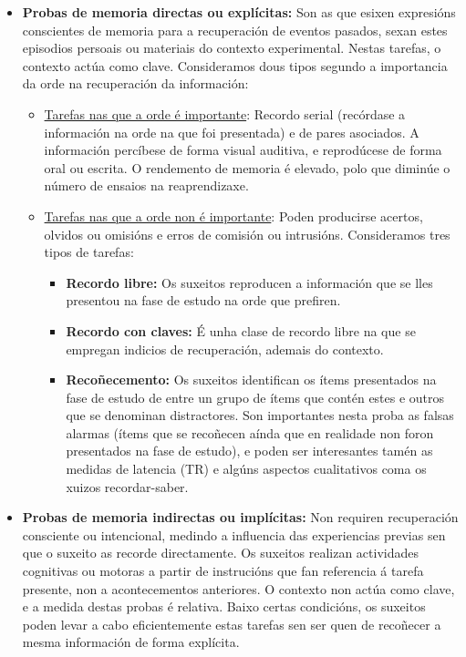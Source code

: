\documentclass[a4paper,11pt]{article}
\begin{document}
\begin{itemize}
	\item \textbf{Probas de memoria directas ou explícitas:} Son as que esixen expresións
	conscientes de memoria para a recuperación de eventos pasados, sexan estes episodios persoais ou 
	materiais do contexto experimental. Nestas tarefas, o contexto actúa como clave. Consideramos 
	dous tipos segundo a importancia da orde na recuperación da información:
	\begin{itemize}
		\item \underline{Tarefas nas que a orde é importante}: Recordo serial (recórdase a 
		información na orde na que foi presentada) e de pares asociados. A información percíbese de 
		forma visual auditiva, e reprodúcese de forma oral ou escrita. O rendemento de memoria é 
		elevado, polo que diminúe o número de ensaios na reaprendizaxe.
		\item \underline{Tarefas nas que a orde non é importante}: Poden producirse acertos, olvidos 
		ou omisións e erros de comisión ou intrusións. Consideramos tres tipos de tarefas:
		\begin{itemize}
			\item \textbf{Recordo libre:} Os suxeitos reproducen a información que se lles presentou 
			na fase de estudo na orde que prefiren.
			\item \textbf{Recordo con claves:} É unha clase de recordo libre na que se empregan 
			indicios de recuperación, ademais do contexto.
			\item \textbf{Recoñecemento:} Os suxeitos identifican os ítems presentados na fase de 
			estudo de entre un grupo de ítems que contén estes e outros que se denominan 
			distractores. Son importantes nesta proba as falsas alarmas (ítems que se recoñecen 
			aínda que en realidade non foron presentados na fase de estudo), e poden ser 
			interesantes tamén as medidas de latencia (TR) e algúns aspectos cualitativos coma os 
			xuizos recordar-saber.
		\end{itemize}
	\end{itemize}
	\item \textbf{Probas de memoria indirectas ou implícitas:} Non requiren recuperación consciente 
	ou intencional, medindo a influencia das experiencias previas sen que o suxeito as recorde 
	directamente. Os suxeitos realizan actividades cognitivas ou motoras a partir de instrucións 
	que fan referencia á tarefa presente, non a acontecementos anteriores. O contexto non actúa 
	como clave, e a medida destas probas é relativa. Baixo certas condicións, os suxeitos poden 
	levar a cabo eficientemente estas tarefas sen ser quen de recoñecer a mesma información de forma 
	explícita. 
	

\end{itemize}
\end{document}
